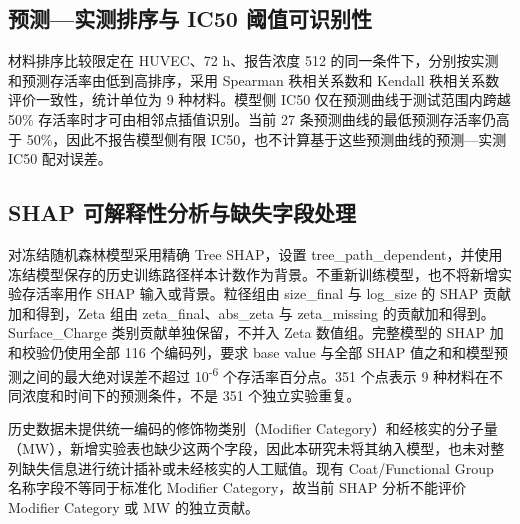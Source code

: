 \subsection{预测—实测排序与 IC50 阈值可识别性}

材料排序比较限定在 HUVEC、72 h、报告浓度 512 的同一条件下，分别按实测和预测存活率由低到高排序，采用 Spearman 秩相关系数和 Kendall 秩相关系数评价一致性，统计单位为 9 种材料。模型侧 IC50 仅在预测曲线于测试范围内跨越 50\% 存活率时才可由相邻点插值识别。当前 27 条预测曲线的最低预测存活率仍高于 50\%，因此不报告模型侧有限 IC50，也不计算基于这些预测曲线的预测—实测 IC50 配对误差。

\subsection{SHAP 可解释性分析与缺失字段处理}

对冻结随机森林模型采用精确 Tree SHAP，设置 tree\_path\_dependent，并使用冻结模型保存的历史训练路径样本计数作为背景。不重新训练模型，也不将新增实验存活率用作 SHAP 输入或背景。粒径组由 size\_final 与 log\_size 的 SHAP 贡献加和得到，Zeta 组由 zeta\_final、abs\_zeta 与 zeta\_missing 的贡献加和得到。Surface\_Charge 类别贡献单独保留，不并入 Zeta 数值组。完整模型的 SHAP 加和校验仍使用全部 116 个编码列，要求 base value 与全部 SHAP 值之和和模型预测之间的最大绝对误差不超过 10\textsuperscript{-}\textsuperscript{6} 个存活率百分点。351 个点表示 9 种材料在不同浓度和时间下的预测条件，不是 351 个独立实验重复。

历史数据未提供统一编码的修饰物类别（Modifier Category）和经核实的分子量（MW），新增实验表也缺少这两个字段，因此本研究未将其纳入模型，也未对整列缺失信息进行统计插补或未经核实的人工赋值。现有 Coat/Functional Group 名称字段不等同于标准化 Modifier Category，故当前 SHAP 分析不能评价 Modifier Category 或 MW 的独立贡献。
